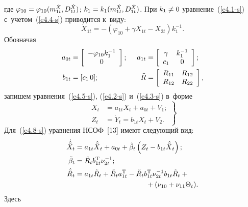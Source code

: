 \begin{multicols}{2}
 \noindent
 {где $\varphi_{10} \hm=\varphi_{10} (m_{1t}^{\dot X}, D_{1t}^{\dot X})$; $k_1\hm= 
k_1(m_{1t}^{\dot X}, D_{1t}^{\dot X})$. При  $k_1\hm\ne 0$ уравнение~(\ref{e4.1-s}) с~учетом~(\ref{e4.4-s}) приводится к~\mbox{виду}}:
    \begin{equation}
    \dot X_{1t} = -\left(\varphi_{10} + \gamma X_{1t} - X_{2t}\right) k_1^{-1}. 
    \label{e4.5-s}
    \end{equation}
  {Обозначая}
    \begin{alignat*}{2}
    a_{0t} &= \lk \begin{array}{c}
    -\varphi_{10} k_1^{-1}\\
    0
    \end{array}\rk;&\enskip
    a_{1t} &= \lk \begin{array}{cc}
    \gamma&k_1^{-1}\\
    c_1&0
    \end{array}\rk;
   \\
    b_{1t} &= [c_1\, 0];&\enskip \tilde R &= \left[\begin{array}{cc}
    R_{11}& R_{12}\\
    R_{12}& R_{22}
    \end{array}\right],
    \end{alignat*}
 {запишем уравнения~(\ref{e4.5-s}), (\ref{e4.2-s}) и~(\ref{e4.3-s}) в~форме}
     \begin{equation}
     \left.
     \begin{array}{rl}
     \dot X_t &= a_{1t} X_t + a_{0t} + V_1; %
\\[6pt]
Z_t &=\dot Y_t= b_{1t} X_t + V_2.
\end{array}
\right\}
\label{e4.8-s}
\end{equation}
 {Для~(\ref{e4.8-s}) %
уравнения НСОФ~[13] имеют сле\-ду\-ющий вид}:
\begin{align}
\dot{\hat{\tilde X}}_t& = a_{1t} {\hat{\tilde X}}_t + a_{0t} +\tilde 
\beta_t \left(Z_t - b_{1t} {\hat{\tilde X}}_t\right);\notag
\\
  \tilde \beta_t &=\tilde R_t b_{1t}^{\mathrm{T}} \nu_{2t}^{-1};\notag
  \\
  {\dot{\tilde R}}_t &= a_{1t}\tilde R_t + \tilde R_t a_{1t}^{\mathrm{T}} -\tilde R_t 
b_{1t}^{\mathrm{T}} \nu_{2t}^{-1} b_{1t} \tilde R_t +{}\notag\\
&\hspace*{35mm}{}+ (\nu_{10}+\nu_{11} \Theta_t).
\label{e4.11-s}
\end{align}
 {Здесь}
 

\end{multicols}
